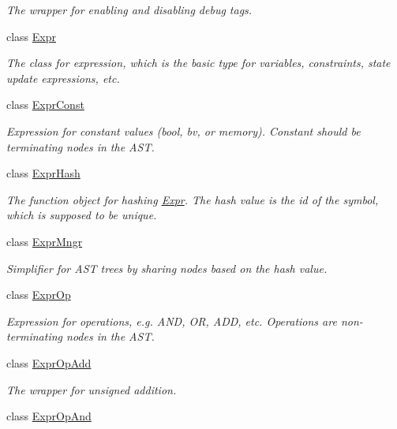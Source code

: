 \begin{DoxyCompactItemize}
\begin{DoxyCompactList}\small\item\em The wrapper for enabling and disabling debug tags. \end{DoxyCompactList}\item 
class \mbox{\hyperlink{classilang_1_1_expr}{Expr}}
\begin{DoxyCompactList}\small\item\em The class for expression, which is the basic type for variables, constraints, state update expressions, etc. \end{DoxyCompactList}\item 
class \mbox{\hyperlink{classilang_1_1_expr_const}{Expr\+Const}}
\begin{DoxyCompactList}\small\item\em Expression for constant values (bool, bv, or memory). Constant should be terminating nodes in the A\+ST. \end{DoxyCompactList}\item 
class \mbox{\hyperlink{classilang_1_1_expr_hash}{Expr\+Hash}}
\begin{DoxyCompactList}\small\item\em The function object for hashing \mbox{\hyperlink{classilang_1_1_expr}{Expr}}. The hash value is the id of the symbol, which is supposed to be unique. \end{DoxyCompactList}\item 
class \mbox{\hyperlink{classilang_1_1_expr_mngr}{Expr\+Mngr}}
\begin{DoxyCompactList}\small\item\em Simplifier for A\+ST trees by sharing nodes based on the hash value. \end{DoxyCompactList}\item 
class \mbox{\hyperlink{classilang_1_1_expr_op}{Expr\+Op}}
\begin{DoxyCompactList}\small\item\em Expression for operations, e.\+g. A\+ND, OR, A\+DD, etc. Operations are non-\/terminating nodes in the A\+ST. \end{DoxyCompactList}\item 
class \mbox{\hyperlink{classilang_1_1_expr_op_add}{Expr\+Op\+Add}}
\begin{DoxyCompactList}\small\item\em The wrapper for unsigned addition. \end{DoxyCompactList}\item 
class \mbox{\hyperlink{classilang_1_1_expr_op_and}{Expr\+Op\+And}}

\end{DoxyCompactItemize}
